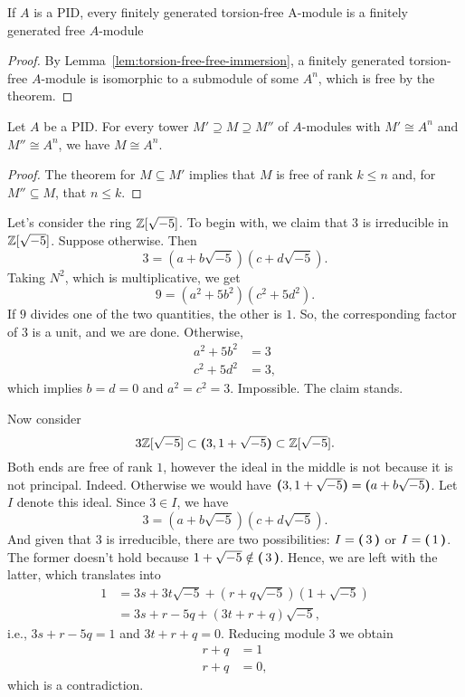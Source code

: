 \begin{cor}\label{cor:PID-submodule-of-torsion-free-is-free}
    If\/ $A$ is a PID, every finitely generated torsion-free A-module is a finitely generated free\/ $A$-module
\end{cor}

\begin{proof}
    By Lemma~\ref{lem:torsion-free-free-immersion}, a finitely generated torsion-free $A$-module is isomorphic to a submodule of some $A^n$, which is free by the theorem.
\end{proof}

\begin{cor}
    Let\/ $A$ be a PID. For every tower\/ $M' \supseteq M \supseteq M''$  of\/ $A$-modules with\/ $M' \cong A^n$ and $M'' \cong A^n$, we have\/ $M \cong A^n$.
\end{cor}

\begin{proof}
    The theorem for $M\subseteq M'$ implies that $M$ is free of rank $k\le n$ and, for $M''\subseteq M$, that $n\le k$.
\end{proof}

\begin{xmpl}
    Let's consider the ring $\mathbb{Z}[\sqrt{-5}]$. To begin with, we claim that $3$ is irreducible in $\mathbb{Z}[\sqrt{-5}]$. Suppose otherwise. Then
    $$
        3 = (a+b\sqrt{-5})(c+d\sqrt{-5}).
    $$
    Taking $N^2$, which is multiplicative, we get
    \begin{equation}\label{eq:9=blah}
        9 = (a^2+5b^2)(c^2+5d^2).
    \end{equation}
    If $9$ divides one of the two quantities, the other is $1$. So, the corresponding factor of $3$ is a unit, and we are done. Otherwise,
    \begin{align*}
        a^2+5b^2&=3\\
        c^2+5d^2&=3,
    \end{align*}
    which implies $b=d=0$ and $a^2=c^2=3$. Impossible. The claim stands.

    Now consider
    $$
        3\mathbb{Z}[\sqrt{-5}]
            \subset\textrm{\boldmath$($}3, 1 + \sqrt{-5}\textrm{\boldmath$)$}
            \subset \mathbb{Z}[\sqrt{-5}].
    $$
    Both ends are free of rank $1$, however the ideal in the middle is not because it is not principal. Indeed. Otherwise we would have $\textrm{\boldmath$($}3, 1 + \sqrt{-5}\textrm{\boldmath$)$}=\textrm{\boldmath$($}a+b\sqrt{-5}\textrm{\boldmath$)$}$. Let $I$ denote this ideal. Since $3\in I$, we have
    $$
        3 = (a+b\sqrt{-5})(c+d\sqrt{-5}).
    $$
    And given that $3$ is irreducible, there are two possibilities: $I=\textrm{\boldmath$($}\,3\,\textrm{\boldmath$)$}$ or $I=\textrm{\boldmath$($}\,1\,\textrm{\boldmath$)$}$. The former doesn't hold because $1+\sqrt{-5}\notin\textrm{\boldmath$($}\,3\,\textrm{\boldmath$)$}$. Hence, we are left with the latter, which translates into
    \begin{align*}
        1 &= 3s+3t\sqrt{-5} + (r+q\sqrt{-5})(1+\sqrt{-5})\\
            &= 3s+r-5q + (3t+r+q)\sqrt{-5},
    \end{align*}
    i.e., $3s+r-5q=1$ and $3t+r+q=0$. Reducing module $3$ we obtain
    \begin{align*}
        r+q &= 1\\
        r+q &= 0,
    \end{align*}
    which is a contradiction.
\end{xmpl}

